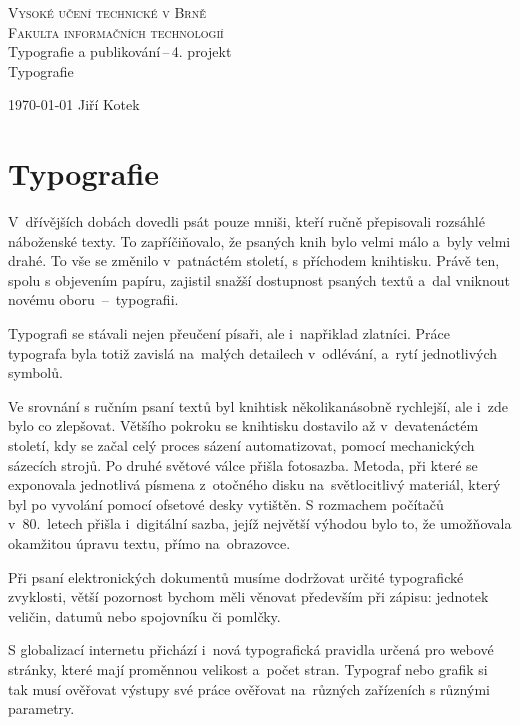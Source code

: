 \documentclass [11pt, a4paper] {article}
\begin{document}
    
    \begin{titlepage}
        \begin{center}
        \Huge
        \textsc{Vysoké učení technické v Brně\\
        \huge
        {Fakulta informačních technologií}\\}
        \LARGE
        Typografie a publikování\,--\,4. projekt \\
        \Huge{Typografie}
        \end{center} 
        {\Large \today \hfill
        Jiří Kotek}
    \end{titlepage}

    \section*{Typografie}
    V~dřívějších dobách dovedli psát pouze mniši, kteří ručně přepisovali rozsáhlé náboženské texty. To zapříčiňovalo, že psaných knih bylo velmi málo a~byly velmi drahé. To vše se změnilo v~patnáctém století, s příchodem knihtisku.
    Právě ten, spolu s objevením papíru, zajistil snažší dostupnost psaných textů a~dal vniknout novému oboru \,--\, typografii.\cite{Georges}
    
    Typografi se stávali nejen přeučení písaři, ale i~napřiklad zlatníci. Práce typografa byla totiž zavislá na~malých detailech v~odlévání, a~rytí jednotlivých symbolů. \cite{Dusong} 

    Ve srovnání s ručním psaní textů byl knihtisk několikanásobně rychlejší, ale i~zde bylo co zlepšovat. 
    Většího pokroku se knihtisku dostavilo až v~devatenáctém století, kdy se začal celý proces sázení automatizovat, pomocí mechanických sázecích strojů. 
    Po druhé světové válce přišla fotosazba. Metoda, při které se exponovala jednotlivá písmena z~otočného disku na~světlocitlivý materiál, který byl po vyvolání pomocí ofsetové desky vytištěn.
    S rozmachem počítačů v~80.~letech přišla i~digitální sazba, jejíž největší výhodou bylo to, že umožňovala okamžitou úpravu textu, přímo na~obrazovce. \cite{JanNemec}

    Při psaní elektronických dokumentů musíme dodržovat určité typografické zvyklosti, větší pozornost bychom měli věnovat především při zápisu: jednotek veličin, datumů nebo spojovníku či pomlčky. \cite{NaPocitaci}

    S globalizací internetu přichází i~nová typografická pravidla určená pro webové stránky, které mají proměnnou velikost a~počet stran. 
    Typograf nebo grafik si tak musí ověřovat výstupy své práce ověřovat na~různých zařízeních s různými parametry. \cite{JirKaspar}
\end{document}
